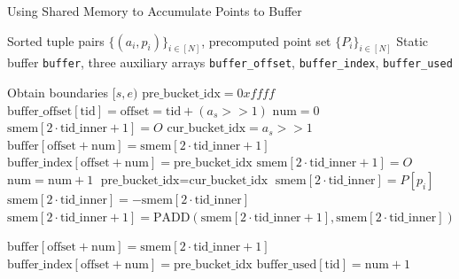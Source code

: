 \documentclass[journal=tches,final]{iacrtrans}
\begin{document}
\begin{algorithm}
    \caption{Using Shared Memory to Accumulate Points to Buffer}
    \label{alg:shared-memory-accumulation}
    \begin{algorithmic}[1]
    \REQUIRE Sorted tuple pairs $\{(a_i, p_i)\}_{i \in [N]}$, precomputed point set $\{P_i\}_{i \in [N]}$
    \ENSURE Static buffer \texttt{buffer}, three auxiliary arrays \texttt{buffer\_offset}, \texttt{buffer\_index}, \texttt{buffer\_used}
    
    \STATE Obtain boundaries $[s, e)$
    \STATE $\text{pre\_bucket\_idx} = 0xffff$ 
    \STATE $\text{buffer\_offset}[\text{tid}] = \text{offset} = \text{tid} + (a_s >> 1)$
    \STATE $\text{num} = 0$
    \STATE $\text{smem}[2 \cdot \text{tid\_inner} + 1] = O$ 
        \STATE $\text{cur\_bucket\_idx} = a_s >> 1$
            \STATE $\text{buffer}[\text{offset} + \text{num}] = \text{smem}[2 \cdot \text{tid\_inner} + 1]$
            \STATE $\text{buffer\_index}[\text{offset} + \text{num}] = \text{pre\_bucket\_idx}$
            \STATE $\text{smem}[2 \cdot \text{tid\_inner} + 1] = O$
            \STATE $\text{num} = \text{num} + 1$
        \ENDIF
        \STATE $\text{pre\_bucket\_idx} = \text{cur\_bucket\_idx}$
        \STATE $\text{smem}[2 \cdot \text{tid\_inner}] = P[p_i]$ 
            \STATE $\text{smem}[2 \cdot \text{tid\_inner}] = -\text{smem}[2 \cdot \text{tid\_inner}]$
        \ENDIF
        \STATE $\text{smem}[2 \cdot \text{tid\_inner} + 1] = \text{PADD}(\text{smem}[2 \cdot \text{tid\_inner} + 1], \text{smem}[2 \cdot \text{tid\_inner}])$
    \ENDFOR
    
    \STATE $\text{buffer}[\text{offset} + \text{num}] = \text{smem}[2 \cdot \text{tid\_inner} + 1]$
    \STATE $\text{buffer\_index}[\text{offset} + \text{num}] = \text{pre\_bucket\_idx}$
    \STATE $\text{buffer\_used}[\text{tid}] = \text{num} + 1$
\end{algorithmic}
\end{algorithm}
\end{document}
